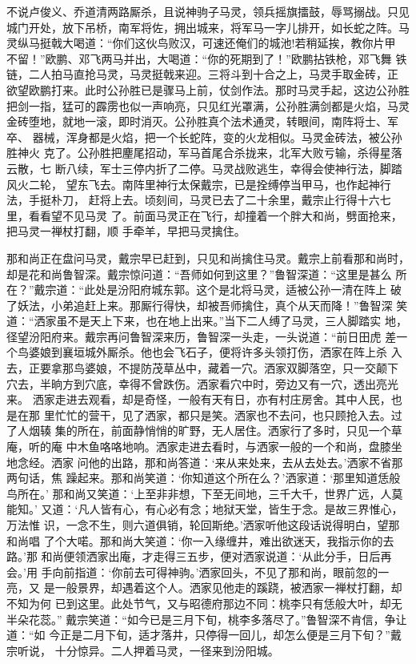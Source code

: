 不说卢俊义、乔道清两路厮杀，且说神驹子马灵，领兵摇旗擂鼓，辱骂搦战。只见
城门开处，放下吊桥，南军将佐，拥出城来，将军马一字儿排开，如长蛇之阵。马
灵纵马挺戟大喝道：“你们这伙鸟败汉，可速还俺们的城池!若稍延挨，教你片甲
不留！”欧鹏、邓飞两马并出，大喝道：“你的死期到了！”欧鹏拈铁枪，邓飞舞
铁链，二人拍马直抢马灵，马灵挺戟来迎。三将斗到十合之上，马灵手取金砖，正
欲望欧鹏打来。此时公孙胜已是骤马上前，仗剑作法。那时马灵手起，这边公孙胜
把剑一指，猛可的霹雳也似一声响亮，只见红光罩满，公孙胜满剑都是火焰，马灵
金砖堕地，就地一滚，即时消灭。公孙胜真个法术通灵，转眼间，南阵将士、军卒、
器械，浑身都是火焰，把一个长蛇阵，变的火龙相似。马灵金砖法，被公孙胜神火
克了。公孙胜把麈尾招动，军马首尾合杀拢来，北军大败亏输，杀得星落云散，七
断八续，军士三停内折了二停。马灵战败逃生，幸得会使神行法，脚踏风火二轮，
望东飞去。南阵里神行太保戴宗，已是拴缚停当甲马，也作起神行法，手挺朴刀，
赶将上去。顷刻间，马灵已去了二十余里，戴宗止行得十六七里，看看望不见马灵
了。前面马灵正在飞行，却撞着一个胖大和尚，劈面抢来，把马灵一禅杖打翻，顺
手牵羊，早把马灵擒住。

那和尚正在盘问马灵，戴宗早已赶到，只见和尚擒住马灵。戴宗上前看那和尚时，
却是花和尚鲁智深。戴宗惊问道：“吾师如何到这里？”鲁智深道：“这里是甚么
所在？”戴宗道：“此处是汾阳府城东郭。这个是北将马灵，适被公孙一清在阵上
破了妖法，小弟追赶上来。那厮行得快，却被吾师擒住，真个从天而降！”鲁智深
笑道：“洒家虽不是天上下来，也在地上出来。”当下二人缚了马灵，三人脚踏实
地，径望汾阳府来。戴宗再问鲁智深来历，鲁智深一头走，一头说道：“前日田虎
差一个鸟婆娘到襄垣城外厮杀。他也会飞石子，便将许多头领打伤，洒家在阵上杀
入去，正要拿那鸟婆娘，不提防茂草丛中，藏着一穴。洒家双脚落空，只一交颠下
穴去，半晌方到穴底，幸得不曾跌伤。洒家看穴中时，旁边又有一穴，透出亮光来。
洒家走进去观看，却是奇怪，一般有天有日，亦有村庄房舍。其中人民，也是在那
里忙忙的营干，见了洒家，都只是笑。洒家也不去问，也只顾抢入去。过了人烟辏
集的所在，前面静悄悄的旷野，无人居住。洒家行了多时，只见一个草庵，听的庵
中木鱼咯咯地响。洒家走进去看时，与洒家一般的一个和尚，盘膝坐地念经。洒家
问他的出路，那和尚答道：‘来从来处来，去从去处去。’洒家不省那两句话，焦
躁起来。那和尚笑道：‘你知道这个所在么？’洒家道：‘那里知道恁般鸟所在。’
那和尚又笑道：‘上至非非想，下至无间地，三千大千，世界广远，人莫能知。’
又道：‘凡人皆有心，有心必有念；地狱天堂，皆生于念。是故三界惟心，万法惟
识，一念不生，则六道俱销，轮回斯绝。’洒家听他这段话说得明白，望那和尚唱
了个大喏。那和尚大笑道：‘你一入缘缠井，难出欲迷天，我指示你的去路。’那
和尚便领洒家出庵，才走得三五步，便对洒家说道：‘从此分手，日后再会。’用
手向前指道：‘你前去可得神驹。’洒家回头，不见了那和尚，眼前忽的一亮，又
是一般景界，却遇着这个人。洒家见他走的蹊跷，被洒家一禅杖打翻，却不知为何
已到这里。此处节气，又与昭德府那边不同：桃李只有恁般大叶，却无半朵花蕊。”
戴宗笑道：“如今已是三月下旬，桃李多落尽了。”鲁智深不肯信，争让道：“如
今正是二月下旬，适才落井，只停得一回儿，却怎么便是三月下旬？”戴宗听说，
十分惊异。二人押着马灵，一径来到汾阳城。

